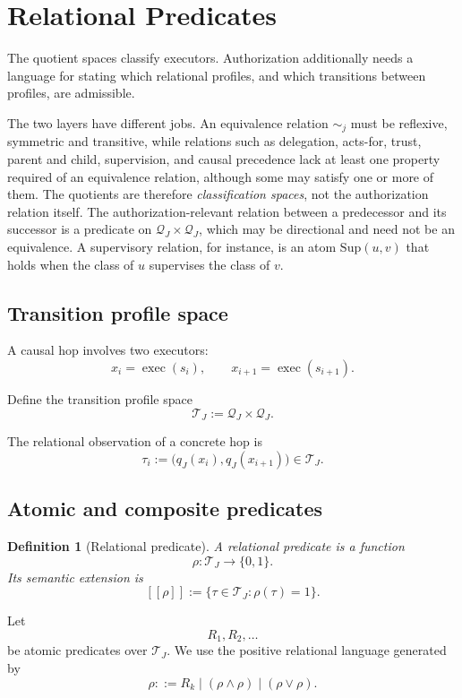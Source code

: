 \documentclass[10pt,twocolumn]{article}
\newcommand{\sem}[1]{\left[\!\left[#1\right]\!\right]}
\newcommand{\Profiles}{\mathcal{Q}}
\newcommand{\Transitions}{\mathcal{T}}
\newcommand{\exec}{\operatorname{exec}}
\newtheorem{definition}{Definition}
\begin{document}
\section{Relational Predicates}

The quotient spaces classify executors. Authorization additionally needs a
language for stating which relational profiles, and which transitions between
profiles, are admissible.

The two layers have different jobs. An equivalence relation \(\sim_j\) must be
reflexive, symmetric and transitive, while relations such as delegation,
acts-for, trust, parent and child, supervision, and causal precedence lack at
least one property required of an equivalence relation, although some may
satisfy one or more of them. The quotients are therefore
\emph{classification spaces}, not the
authorization relation itself. The authorization-relevant relation between a
predecessor and its successor is a predicate on
\(\Profiles_J\times\Profiles_J\), which may be directional and need not be an
equivalence. A supervisory relation, for instance, is an atom
\(\mathrm{Sup}(u,v)\) that holds when the class of \(u\) supervises the class
of \(v\).

\subsection{Transition profile space}

A causal hop involves two executors:
\[
x_i=\exec(s_i),
\qquad
x_{i+1}=\exec(s_{i+1}).
\]

Define the transition profile space
\[
\Transitions_J
:=
\Profiles_J\times\Profiles_J.
\]

The relational observation of a concrete hop is
\[
\tau_i
:=
\big(
q_J(x_i),
q_J(x_{i+1})
\big)
\in\Transitions_J.
\]

\subsection{Atomic and composite predicates}

\begin{definition}[Relational predicate]
A relational predicate is a function
\[
\rho:\Transitions_J\rightarrow\{0,1\}.
\]
Its semantic extension is
\[
\sem{\rho}
:=
\{\tau\in\Transitions_J:\rho(\tau)=1\}.
\]
\end{definition}

Let
\[
R_1,R_2,\ldots
\]
be atomic predicates over \(\Transitions_J\). We use the positive relational
language generated by
\[
\rho ::= R_k \mid (\rho\land\rho)\mid(\rho\lor\rho).
\]
\end{document}

